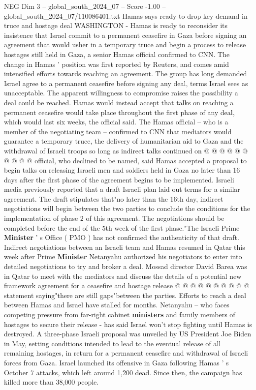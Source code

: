 \begin{textsample}{NEG Dim 3 – global\_south\_2024\_07 – Score -1.00 – global\_south\_2024\_07/110086401.txt}  \label{ex:f3_neg_149}
Hamas says ready to drop key demand in truce and hostage deal WASHINGTON - Hamas is ready to reconsider its insistence that Israel commit to a permanent ceasefire in Gaza before signing an agreement that would usher in a temporary truce and begin a process to release hostages still held in Gaza, a senior Hamas official confirmed to CNN.
The change in Hamas ' position was first reported by Reuters, and comes amid intensified efforts towards reaching an agreement.
The group has long demanded Israel agree to a permanent ceasefire before signing any deal, terms Israel sees as unacceptable.
The apparent willingness to compromise raises the possibility a deal could be reached.
Hamas would instead accept that talks on reaching a permanent ceasefire would take place throughout the first phase of any deal, which would last six weeks, the official said.
The Hamas official -- who is a member of the negotiating team -- confirmed to CNN that mediators would guarantee a temporary truce, the delivery of humanitarian aid to Gaza and the withdrawal of Israeli troops so long as indirect talks continued on @ @ @ @ @ @ @ @ @ @ official, who declined to be named, said Hamas accepted a proposal to begin talks on releasing Israeli men and soldiers held in Gaza no later than 16 days after the first phase of the agreement begins to be implemented.
Israeli media previously reported that a draft Israeli plan laid out terms for a similar agreement.
The draft stipulates that"no later than the 16th day, indirect negotiations will begin between the two parties to conclude the conditions for the implementation of phase 2 of this agreement.
The negotiations should be completed before the end of the 5th week of the first phase."The Israeli Prime \textbf{Minister} ' s Office ( PMO ) has not confirmed the authenticity of that draft.
Indirect negotiations between an Israeli team and Hamas resumed in Qatar this week after Prime \textbf{Minister} Netanyahu authorized his negotiators to enter into detailed negotiations to try and broker a deal.
Mossad director David Barea was in Qatar to meet with the mediators and discuss the details of a potential new framework agreement for a ceasefire and hostage release @ @ @ @ @ @ @ @ @ @ statement saying"there are still gaps"between the parties.
Efforts to reach a deal between Hamas and Israel have stalled for months.
Netanyahu -- who faces competing pressure from far-right cabinet \textbf{ministers} and family members of hostages to secure their release - has said Israel won't stop fighting until Hamas is destroyed.
A three-phase Israeli proposal was unveiled by US President Joe Biden in May, setting conditions intended to lead to the eventual release of all remaining hostages, in return for a permanent ceasefire and withdrawal of Israeli forces from Gaza.
Israel launched its offensive in Gaza following Hamas ' s October 7 attacks, which left around 1,200 dead.
Since then, the campaign has killed more than 38,000 people.

\end{textsample}
